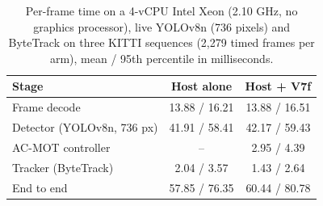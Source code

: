 \begin{table}[t]
\centering
\caption{Per-frame time on a 4-vCPU Intel Xeon (2.10 GHz, no graphics processor), live YOLOv8n (736 pixels) and ByteTrack on three KITTI sequences (2,279 timed frames per arm), mean / 95th percentile in milliseconds.}
\label{tab:runtime}
\small
\begin{tabular}{lcc}
\hline
Stage & Host alone & Host + V7f \\
\hline
Frame decode & 13.88 / 16.21 & 13.88 / 16.51 \\
Detector (YOLOv8n, 736 px) & 41.91 / 58.41 & 42.17 / 59.43 \\
AC-MOT controller & -- & 2.95 / 4.39 \\
Tracker (ByteTrack) & 2.04 / 3.57 & 1.43 / 2.64 \\
End to end & 57.85 / 76.35 & 60.44 / 80.78 \\
\hline
\end{tabular}
\end{table}

